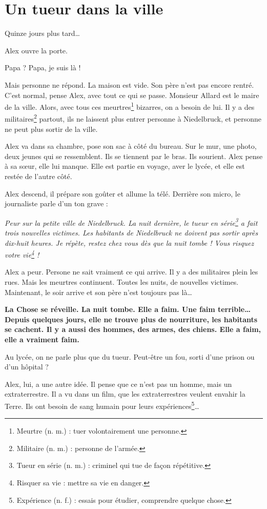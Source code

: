 \chapter{Un tueur dans la ville}
Quinze jours plus tard\ldots{}

Alex ouvre la porte.

\og Papa ? Papa, je suis là ! \fg{}

Mais personne ne répond. La maison est vide. Son père n'est pas encore rentré. C'est normal, pense Alex, avec tout ce qui se
passe. Monsieur Allard est le maire de la ville. Alors, avec tous ces meurtres\footnote{Meurtre (n. m.) : tuer volontairement une
personne.} bizarres, on a besoin de lui. Il y a des militaires\footnote{Militaire (n. m.) : personne de l'armée.} partout, ils ne
laissent plus entrer personne à Niedelbruck, et personne ne peut plus sortir de la ville.

Alex va dans sa chambre, pose son sac à côté du bureau. Sur le mur, une photo, deux jeunes qui se ressemblent. Ils se tiennent par
le bras. Ils sourient. Alex pense à sa s\oe{}ur, elle lui manque. Elle est partie en voyage, aver le lycée, et elle est restée de
l'autre côté.

Alex descend, il prépare son goûter et allume la télé. Derrière son micro, le journaliste parle d'un ton grave :

\emph{\og Peur sur la petite ville de Niedelbruck. La nuit dernière, le tueur en série\footnote{Tueur en série (n. m.) : criminel
qui tue de fa\c{c}on répétitive.} a fait trois nouvelles victimes. Les habitants de Niedelbruck ne doivent pas sortir après
dix-huit heures. Je répète, restez chez vous dès que la nuit tombe ! Vous risquez votre vie\footnote{Risquer sa vie : mettre sa
vie en danger.} ! \fg{}}

Alex a peur. Persone ne sait vraiment ce qui arrive. Il y a des militaires plein les rues. Mais les meurtres continuent. Toutes
les nuits, de nouvelles victimes. Maintenant, le soir arrive et son père n'est toujours pas là\ldots{}

\textbf{La Chose se réveille. La nuit tombe. Elle a faim. Une faim terrible\ldots{} Depuis quelques jours, elle ne trouve plus de
nourriture, les habitants se cachent. Il y a aussi des hommes, des armes, des chiens. Elle a faim, elle a vraiment faim.}

Au lycée, on ne parle plus que du tueur. Peut-être un fou, sorti d'une prison ou d'un hôpital ?

Alex, lui, a une autre idée. Il pense que ce n'est pas un homme, mais un extraterrestre. Il a vu dans un film, que les
extraterrestres veulent envahir la Terre. Ils ont besoin de sang humain pour leurs expériences\footnote{Expérience (n. f.) :
essais pour étudier, comprendre quelque chose.}\ldots{}

